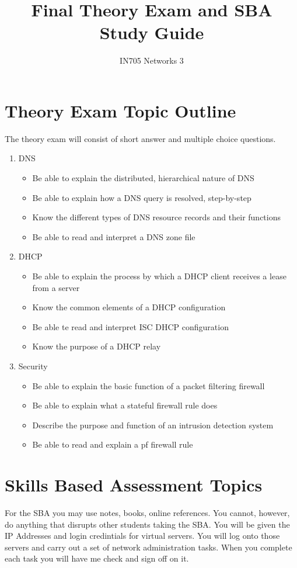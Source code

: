 \documentclass[10pt,a4paper]{article}
\author{IN705 Networks 3}
\title{Final Theory Exam and SBA Study Guide}
\begin{document}
\maketitle

\section*{Theory Exam Topic Outline}
The theory exam will consist of short answer and multiple choice questions.
\begin{enumerate}
\item DNS
  \begin{itemize}
    \item Be able to explain the distributed, hierarchical nature of DNS
    \item Be able to explain how a DNS query is resolved, step-by-step
    \item Know the different types of DNS resource records and their functions
    \item Be able to read and interpret a DNS zone file
  \end{itemize}
\item DHCP
  \begin{itemize}
    \item Be able to explain the process by which a DHCP client receives a lease from a server
    \item Know the common elements of a DHCP configuration
    \item Be able te read and interpret ISC DHCP configuration
    \item Know the purpose of a DHCP relay 
  \end{itemize}
\item Security
  \begin{itemize}
    \item Be able to explain the basic function of a packet filtering firewall
    \item Be able to explain what a stateful firewall rule does
    \item Describe the purpose and function of an intrusion detection system
    \item Be able to read and explain a pf firewall rule
  \end{itemize}

\end{enumerate}
\pagebreak 
\section*{Skills Based Assessment Topics}
For the SBA you may use notes, books, online references.  
You cannot, however, do anything that disrupts other students taking the SBA.  You will be given the IP Addresses and login credintials for virtual servers.  You will log onto those servers and carry out a set of network administration tasks.  When you complete each task you will have me check and sign off on it.
\end{document}
